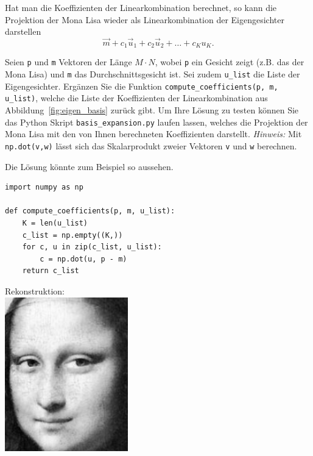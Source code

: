 Hat man die Koeffizienten der Linearkombination berechnet, so kann die Projektion der Mona Lisa wieder als Linearkombination der Eigengesichter darstellen
\begin{equation*}
	\vec m+c_1\vec u_1+c_2\vec u_2+\ldots+c_Ku_K.
\end{equation*}
\begin{aufgabe} \label{aufg:compute_coefficients}
	Seien \texttt{p} und \texttt{m} Vektoren der Länge $M\cdot N$, wobei \texttt{p} ein Gesicht zeigt (z.B. das der Mona Lisa) und \texttt{m} das Durchschnittsgesicht ist.
	Sei zudem \texttt{u\_list} die Liste der Eigengesichter.
	Ergänzen Sie die Funktion \texttt{compute\_coefficients(p, m, u\_list)}, welche die Liste der Koeffizienten der Linearkombination aus Abbildung~\ref{fig:eigen_basis} zurück gibt.
	Um Ihre Lösung zu testen können Sie das Python Skript \texttt{basis\_expansion.py} laufen lassen, welches die Projektion der Mona Lisa mit den von Ihnen berechneten Koeffizienten darstellt.
	\textit{Hinweis:} Mit \texttt{np.dot(v,w)} lässt sich das Skalarprodukt zweier Vektoren \texttt{v} und \texttt{w} berechnen.
\end{aufgabe}
\begin{losung*}
	Die Lösung könnte zum Beispiel so aussehen.\\[0.5cm]
	\begin{minipage}{0.65\textwidth}
\begin{lstlisting}[style=python]
import numpy as np

def compute_coefficients(p, m, u_list):
	K = len(u_list)
	c_list = np.empty((K,))
	for c, u in zip(c_list, u_list):
		c = np.dot(u, p - m)
	return c_list
\end{lstlisting}
	\end{minipage}\hfill
	\begin{minipage}{0.35\textwidth}\vspace{-1cm}
		\centering Rekonstruktion:\\[0.5cm]
		\includegraphics[width=0.4\textwidth]{images/eigenfaces/mona_lisa_original}
	\end{minipage}
\end{losung*}

